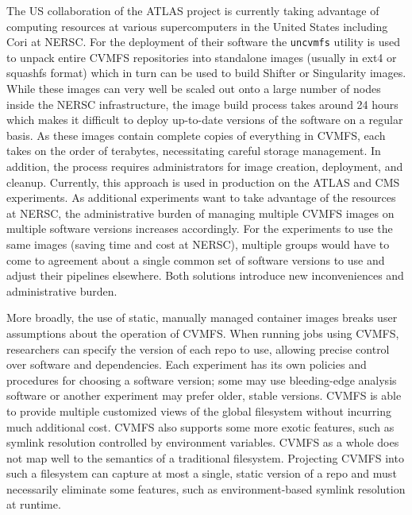 \documentclass[conference]{IEEEtran}
\begin{document}
The US collaboration of the ATLAS project is currently taking advantage of computing resources at various supercomputers in the United States including Cori at NERSC.
For the deployment of their software the \texttt{uncvmfs} utility is used to unpack entire CVMFS repositories into standalone images (usually in ext4 or squashfs format) which in turn can be used to build Shifter or Singularity images.
While these images can very well be scaled out onto a large number of nodes inside the NERSC infrastructure,
the image build process takes around 24 hours which makes it difficult to deploy up-to-date versions of the software on a regular basis.
As these images contain complete copies of everything in CVMFS,
each takes on the order of terabytes,
necessitating careful storage management.
In addition, the process requires administrators for image creation, deployment, and cleanup.
Currently, this approach is used in production on the ATLAS and CMS experiments.
As additional experiments want to take advantage of the resources at NERSC,
the administrative burden of managing multiple CVMFS images on multiple software versions increases accordingly.
For the experiments to use the same images (saving time and cost at NERSC),
multiple groups would have to come to agreement about a single common set of software versions to use and adjust their pipelines elsewhere.
Both solutions introduce new inconveniences and administrative burden.

More broadly, the use of static, manually managed container images breaks user assumptions about the operation of CVMFS.
When running jobs using CVMFS,
researchers can specify the version of each repo to use,
allowing precise control over software and dependencies.
Each experiment has its own policies and procedures for choosing a software version;
some may use bleeding-edge analysis software or another experiment may prefer older, stable versions.
CVMFS is able to provide multiple customized views of the global filesystem without incurring much additional cost.
CVMFS also supports some more exotic features,
such as symlink resolution controlled by environment variables.
CVMFS as a whole does not map well to the semantics of a traditional filesystem.
Projecting CVMFS into such a filesystem can capture at most a single, static version of a repo and must necessarily eliminate some features,
such as environment-based symlink resolution at runtime.
\end{document}
